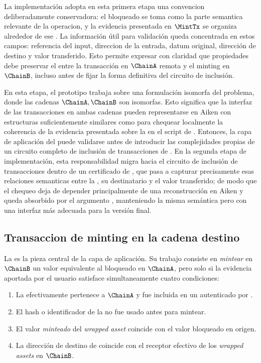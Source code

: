 La implementación adopta en esta primera etapa una convencion deliberadamente conservadora: el \UTxO bloqueado se toma como la parte semantica relevante de la operacion, y la evidencia presentada en $\MintTx$ se organiza alrededor de ese \UTxO. La información útil para validación queda concentrada en estos campos: referencia del input, direccion de la entrada, datum original, dirección de destino y valor transferido. Esto permite expresar con claridad que propiedades debe preservar el \zkBridge entre la transacción en $\ChainA$ remota y el minting en $\ChainB$, incluso antes de fijar la forma definitiva del circuito de inclusión.

En esta etapa, el prototipo trabaja sobre una formulación isomorfa del problema, donde las cadenas $\ChainA, \ChainB$ son isomorfas. Esto significa que la interfaz de las transacciones en ambas cadenas pueden representarse en Aiken con estructuras suficientemente similares como para chequear localmente la coherencia de la evidencia presentada sobre la \LockTx en el script de \MintingValidator. Entonces, la capa de aplicación del \zkBridge puede validarse antes de introducir las complejidades propias de un circuito completo de inclusión de transacciones de \Cardano. En la segunda etapa de implementación, esta responsabilidad migra hacia el circuito de inclusión de transacciones dentro de un certificado de \Mithril, que pasa a capturar precisamente esas relaciones semanticas entre la \LockTx, su destinatario y el valor transferido; de modo que el chequeo deja de depender principalmente de una reconstrucción \Onchain en Aiken y queda absorbido por el argumento \ZK, manteniendo la misma semántica pero con una interfaz más adecuada para la versión final.

\subsection{Transaccion de minting en la cadena destino}

La \MintTx es la pieza central de la capa de aplicación. Su trabajo consiste en \textit{mintear} en $\ChainB$ un valor equivalente al bloqueado en $\ChainA$, pero solo si la evidencia aportada por el usuario satisface simultaneamente cuatro condiciones:

\begin{enumerate}[noitemsep]
  \item La \LockTx efectivamente pertenece a $\ChainA$ y fue incluida en un \TransactionSnapshot autenticado por \Mithril.
  \item El hash o identificador de la \LockTx no fue usado antes para mintear.
  \item El valor \textit{minteado} del \textit{wrapped asset} coincide con el valor bloqueado en origen.
  \item La dirección de destino de \LockTx coincide con el receptor efectivo de los \textit{wrapped assets} en $\ChainB$.
\end{enumerate}


